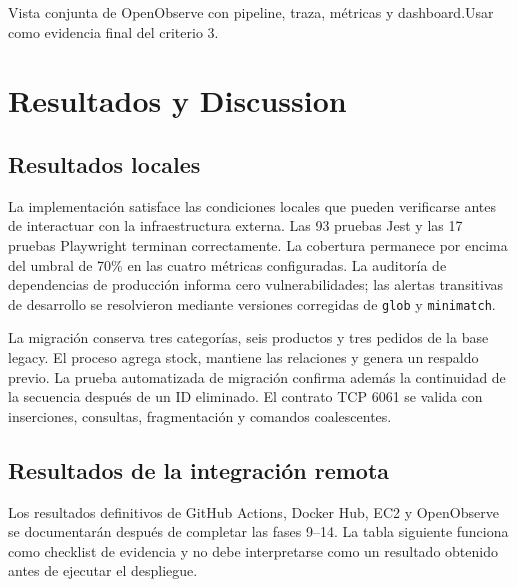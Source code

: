 \documentclass[12pt,a4paper]{article}
\begin{document}
\begin{pendingfigure}{Vista conjunta de OpenObserve con pipeline, traza, métricas y dashboard.}{Usar como evidencia final del criterio 3.}
\label{fig:conjunta}
\end{pendingfigure}

\section{Resultados y Discussion}

\subsection{Resultados locales}

La implementación satisface las condiciones locales que pueden verificarse antes de interactuar con la infraestructura externa. Las 93 pruebas Jest y las 17 pruebas Playwright terminan correctamente. La cobertura permanece por encima del umbral de 70\% en las cuatro métricas configuradas. La auditoría de dependencias de producción informa cero vulnerabilidades; las alertas transitivas de desarrollo se resolvieron mediante versiones corregidas de \texttt{glob} y \texttt{minimatch}.

La migración conserva tres categorías, seis productos y tres pedidos de la base legacy. El proceso agrega stock, mantiene las relaciones y genera un respaldo previo. La prueba automatizada de migración confirma además la continuidad de la secuencia después de un ID eliminado. El contrato TCP 6061 se valida con inserciones, consultas, fragmentación y comandos coalescentes.

\subsection{Resultados de la integración remota}

Los resultados definitivos de GitHub Actions, Docker Hub, EC2 y OpenObserve se documentarán después de completar las fases 9--14. La tabla siguiente funciona como checklist de evidencia y no debe interpretarse como un resultado obtenido antes de ejecutar el despliegue.
\end{document}
